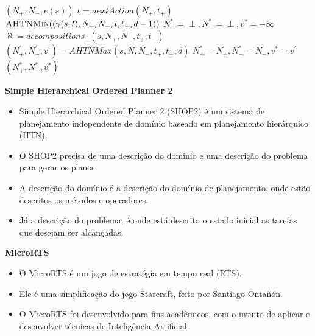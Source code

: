 \documentclass[a0,portrait]{a0poster}
\begin{document}
\begin{multicols}{2}
		\vspace{8mm}
		
		{\large
		\begin{algorithmic}[1]
			\label{alg:lin:firstLine}
			\State	\Return $(N_{+}, N_{-}, e(s))$
			\EndIf
			 \label{alg:ahtn:nexaction}
			\State $t = nextAction(N_{+}, t_{+})$ 
			\State \Return $\Call{AHTNMin}{(\gamma(s,t), N_{+}, N_{-}, t, t_{-}, d-1)}$ \label{alg:ahtn:troca}
			\EndIf
			\State $N_{+}^{*} = \perp, N_{-}^{*} = \perp, v^{*} = -\infty$
			\State $\aleph = decompositions_{+}(s, N_{+}, N_{-}, t_{+}, t_{-})$ \label{alg:decompositions}
			 \label{alg:ahtn:for}
			\State $(N^{'}_{+}, N^{'}_{-}, v^{'}) = AHTNMax(s, N, N_{-}, t_{+}, t_{-}, d)$
			\State $N_{+}^{*} = N^{'}_{+}, N_{-}^{*} = N^{'}_{-}, v^{*} = v^{'} $
			\EndIf
			\EndFor		
			\State \Return $(N_{+}^{*}, N_{-}^{*}, v^{*} )$
			\EndFunction
		\end{algorithmic}
	}
		\vspace{10mm}
		
	\textbf{Simple Hierarchical Ordered Planner 2}
		\begin{itemize}
			\item Simple Hierarchical Ordered Planner 2 (SHOP2) é um sistema de planejamento independente de domínio baseado em planejamento hierárquico (HTN).
			\item O SHOP2 precisa de uma descrição do domínio e uma descrição do problema para gerar os planos.
			\item A descrição do domínio é a descrição do domínio de planejamento, onde estão descritos os métodos e operadores.
			\item Já a descrição do problema, é onde está descrito o estado inicial as tarefas que desejam ser alcançadas.
		\end{itemize}
		
		\vspace{10mm}
	\textbf{MicroRTS}
		\begin{itemize}
			[leftmargin=2em]\itemadjust
			\item O MicroRTS é um jogo de estratégia em tempo real (RTS).
			\item Ele é uma simplificação do jogo Starcraft, feito por Santiago Ontañón.
			\item O MicroRTS foi desenvolvido para fins acadêmicos, com o intuito de aplicar e desenvolver técnicas de Inteligência Artificial.
		\end{itemize}
		

\end{multicols}
\end{document}
